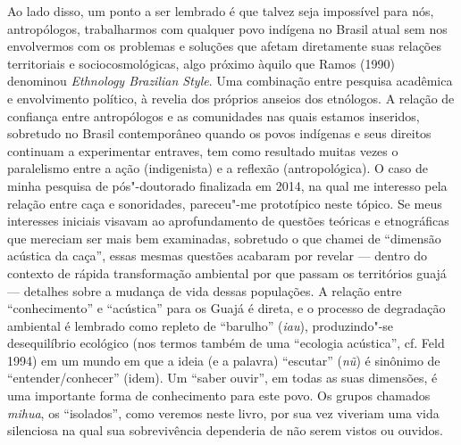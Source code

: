 Ao lado disso, um ponto a ser lembrado é que talvez seja impossível para
nós, antropólogos, trabalharmos com qualquer povo indígena no Brasil
atual sem nos envolvermos com os problemas e soluções que afetam
diretamente suas relações territoriais e sociocosmológicas, algo próximo
àquilo que Ramos (1990) denominou \emph{Ethnology Brazilian Style}.
Uma combinação entre pesquisa acadêmica e envolvimento político, à
revelia dos próprios anseios dos etnólogos. A relação de confiança entre
antropólogos e as comunidades nas quais estamos inseridos, sobretudo no
Brasil contemporâneo quando os povos indígenas e seus direitos continuam
a experimentar entraves, tem como resultado muitas vezes o paralelismo
entre a ação (indigenista) e a reflexão (antropológica). O caso de minha
pesquisa de pós"-doutorado finalizada em 2014, na qual me interesso pela
relação entre caça e sonoridades, pareceu"-me prototípico neste tópico.
Se meus interesses iniciais visavam ao aprofundamento de questões
teóricas e etnográficas que mereciam ser mais bem examinadas, sobretudo
o que chamei de ``dimensão acústica da caça'', essas mesmas questões
acabaram por revelar --- dentro do contexto de rápida transformação
ambiental por que passam os territórios guajá --- detalhes sobre a
mudança de vida dessas populações. A relação entre ``conhecimento'' e
``acústica'' para os Guajá é direta, e o processo de degradação ambiental
é lembrado como repleto de ``barulho'' (\emph{iau}), produzindo"-se
desequilíbrio ecológico (nos termos também de uma ``ecologia acústica'',
cf. Feld 1994) em um mundo em que a ideia (e a palavra) ``escutar''
(\emph{nũ}) é sinônimo de ``entender/conhecer'' (idem). Um ``saber
ouvir'', em todas as suas dimensões, é uma importante forma de
conhecimento para este povo. Os grupos chamados \emph{mihua}, os
``isolados'', como veremos neste livro, por sua vez viveriam uma vida
silenciosa na qual sua sobrevivência dependeria de não serem vistos ou
ouvidos.

